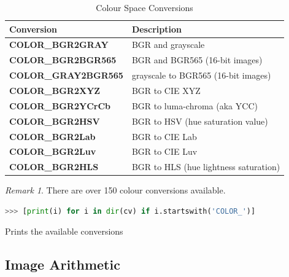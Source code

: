 \documentclass{article}
\theoremstyle{definition}
\theoremstyle{remark}
\newtheorem*{rem}{Remark}
\begin{document}
\begin{table}[h!]
    \centering
    \def\arraystretch{1.1}%
    \begin{tabular}{ p{5cm} p{7cm} } 
	\hline
	Conversion & Description \\
	\hline
	\textbf{\footnotesize{COLOR\_BGR2GRAY}} & BGR and grayscale \\

	\textbf{\footnotesize{COLOR\_BGR2BGR565}} & BGR and BGR565 (16-bit images)  \\

	\textbf{\footnotesize{COLOR\_GRAY2BGR565}} & grayscale to BGR565 (16-bit images)  \\

	\textbf{\footnotesize{COLOR\_BGR2XYZ}} & BGR to CIE XYZ \\

	\textbf{\footnotesize{COLOR\_BGR2YCrCb}} & BGR to luma-chroma (aka YCC) \\

	\textbf{\footnotesize{COLOR\_BGR2HSV}} & BGR to HSV (hue saturation value) \\

	\textbf{\footnotesize{COLOR\_BGR2Lab}} & BGR to CIE Lab \\

	\textbf{\footnotesize{COLOR\_BGR2Luv}} & BGR to CIE Luv \\

	\textbf{\footnotesize{COLOR\_BGR2HLS}} & BGR to HLS (hue lightness saturation) \\
	\hline
    \end{tabular}
    \caption{Colour Space Conversions}
    \label{table:col_convs}
\end{table}

\begin{rem}
There are over 150 colour conversions available.\\

\begin{lstlisting}[language=Python]
>>> [print(i) for i in dir(cv) if i.startswith('COLOR_')]
\end{lstlisting}
Prints the available conversions
\end{rem}


\break


\subsection{Image Arithmetic}
\end{document}
